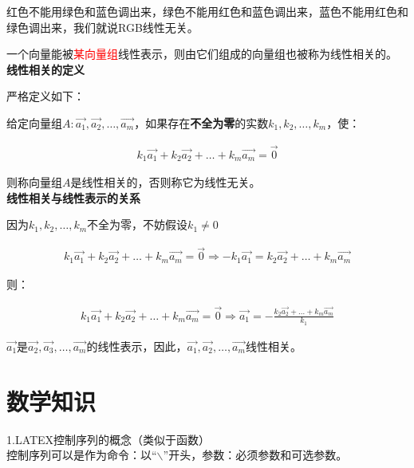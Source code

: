 \documentclass[UTF8]{ctexart}
\begin{document}
红色不能用绿色和蓝色调出来，绿色不能用红色和蓝色调出来，蓝色不能用红色和绿色调出来，我们就说RGB线性无关。

一个向量能被\textcolor{red}{某向量组}线性表示，则由它们组成的向量组也被称为线性相关的。\\

\textbf{线性相关的定义 }

严格定义如下：

给定向量组$A: \vec{a_{1}},\vec{a_{2}},\dots,\vec{a_{m}}$，如果存在\textbf{不全为零}的实数$k_ {1},k_{2},\dots,k_{m}$，使：

\begin{equation}
\begin{aligned}
k_{1}\vec{a_{1}}+k_{2}\vec{a_{2}}+\dots+k_{m}\vec{a_{m}}=\vec{0}
\end{aligned}
\end{equation}

则称向量组$A$是线性相关的，否则称它为线性无关。\\

\textbf{线性相关与线性表示的关系}

因为$k_ {1},k_{2},\dots,k_{m}$不全为零，不妨假设$k_{1} \neq 0$

\begin{equation}
\begin{aligned}
k_{1}\vec{a_{1}}+k_{2}\vec{a_{2}}+\dots+k_{m}\vec{a_{m}}=\vec{0}
\Rightarrow
-k_{1}\vec{a_{1}}=k_{2}\vec{a_{2}}+\dots+k_{m}\vec{a_{m}}
\end{aligned}
\end{equation}

则：

\begin{equation}
\begin{aligned}
k_{1}\vec{a_{1}}+k_{2}\vec{a_{2}}+\dots+k_{m}\vec{a_{m}}=\vec{0}
\Rightarrow
\vec{a_{1}}=-\frac{k_{2}\vec{a_{2}}+\dots+k_{m}\vec{a_{m}}}{k_{1}}
\end{aligned}
\end{equation}

$\vec{a_{1}}$是$\vec{a_{2}},\vec{a_{3}},\dots,\vec{a_{m}}$的线性表示，因此，$\vec{a_{1}},\vec{a_{2}},\dots,\vec{a_{m}}$线性相关。









\section{数学知识}
    1.LATEX控制序列的概念（类似于函数） \\ 控制序列可以是作为命令：以“$\backslash$”开头，参数：必须参数和可选参数。
\end{document}

